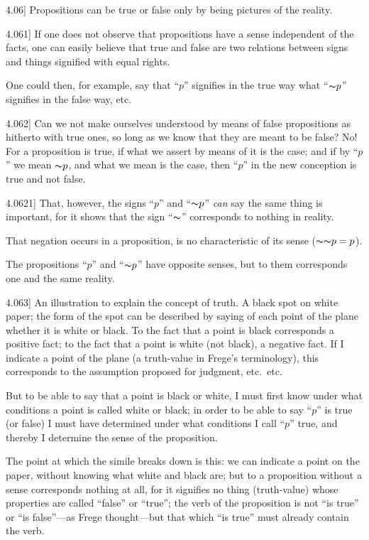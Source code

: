 \documentclass[12pt,oneside]{book}[2007/10/19]
\newcommand{\PropositionE}[2]{%
  \item[\phantomsection\label{PropE:#1}\PropGRef{#1}] #2%
}
\newcommand{\PropGRef}[1]{\hyperref[PropG:#1]{#1}}
\newcommand{\Not}[1]{\mathord{\thicksim} #1}
\begin{document}
\begin{propositions}
\PropositionE{4.06}
{Propositions can be true or false only by being
pictures of the reality.}


\PropositionE{4.061}
{If one does not observe that propositions have
a sense independent of the facts, one can easily
believe that true and false are two relations
between signs and things signified with equal
rights.

One could then, for example, say that ``$p$''
signifies in the true way what ``$\Not{p}$'' signifies in
the false way, etc.}


\PropositionE{4.062}
{Can we not make ourselves understood by
means of false propositions as hitherto with true
ones, so long as we know that they are meant to
be false? No! For a proposition is true, if
what we assert by means of it is the case; and if
by ``$p$'' we mean $\Not{p}$, and what we mean is the
case, then ``$p$'' in the new conception is true
and not false.}


\PropositionE{4.0621}
{That, however, the signs ``$p$'' and ``$\Not{p}$'' \emph{can}
say the same thing is important, for it shows
that the sign ``$\Not{}$'' corresponds to nothing in
reality.

That negation occurs in a proposition, is no
characteristic of its sense ($\Not{\Not{p = p}}$).

The propositions ``$p$'' and ``$\Not{p}$'' have opposite
senses, but to them corresponds one and
the same reality.}


\PropositionE{4.063}
{An illustration to explain the concept of truth.
A black spot on white paper; the form of the spot
can be described by saying of each point of the
plane whether it is white or black. To the fact
that a point is black corresponds a positive fact;
to the fact that a point is white (not black), a
negative fact. If I indicate a point of the plane
(a truth-value in Frege's terminology), this corresponds
to the assumption proposed for judgment,
etc.\ etc.

But to be able to say that a point is black or
white, I must first know under what conditions a
point is called white or black; in order to be able
to say ``$p$'' is true (or false) I must have determined
under what conditions I call ``$p$'' true,
and thereby I determine the sense of the proposition.

The point at which the simile breaks down is
this: we can indicate a point on the paper, without
knowing what white and black are; but to a proposition
without a sense corresponds nothing at
all, for it signifies no thing (truth-value) whose
properties are called ``false'' or ``true''; the verb
of the proposition is not ``is true'' or ``is false''---as
Frege thought---but that which ``is true'' must
already contain the verb.}



\end{propositions}
\end{document}
